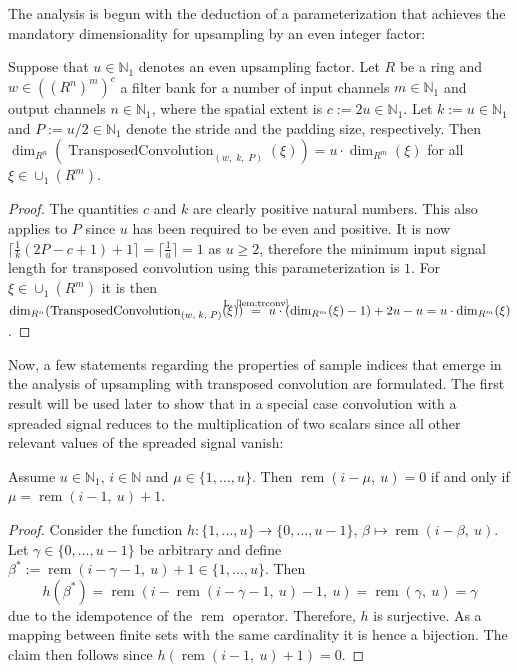 \documentclass[journal]{IEEEtran}
\newcommand{\N}{\mathbb{N}}
\newcommand{\discint}[2]{\{#1,\dotsc,#2\}}
\newcommand{\inint}[2]{\in\discint{#1}{#2}}
\newcommand{\nceil}[1]{\lceil #1 \rceil}
\newcommand{\rem}[2]{\operatorname{rem}(#1,\ #2)}
\newcommand{\equsing}[1]{\overset{\mathclap{\text{#1}}}{=}}
\DeclareMathOperator{\TransposedConvolution}{TransposedConvolution}
\begin{document}
The analysis is begun with the deduction of a parameterization that achieves the mandatory dimensionality for upsampling by an even integer factor:
\begin{remark}
\label{rem:upsmp-trconv}
Suppose that $u\in\N_1$ denotes an even upsampling factor.
Let $R$ be a ring and $w\in((R^n)^m)^c$ a filter bank for a number of input channels $m\in\N_1$ and output channels $n\in\N_1$, where the spatial extent is $c := 2u\in\N_1$.
Let $k := u\in\N_1$ and $P := u/2 \in\N_1$ denote the stride and the padding size, respectively.
Then $\dim_{R^n}(\TransposedConvolution_{(w,\; k,\; P)}(\xi)) = u\cdot\dim_{R^m}(\xi)$ for all $\xi\in\cup_1(R^m)$.
\end{remark}\begin{proof}
The quantities $c$ and $k$ are clearly positive natural numbers.
This also applies to $P$ since $u$ has been required to be even and positive.
It is now $\nceil{\frac{1}{k}(2P - c + 1) + 1} = \nceil{\frac{1}{u}} = 1$ as $u \geq 2$, therefore the minimum input signal length for transposed convolution using this parameterization is $1$.
For $\xi\in\cup_1(R^m)$ it is then $\dim_{R^n}(\TransposedConvolution_{(w,\; k,\; P)}(\xi)) \ \equsing{L.~\ref{lem:trconv}}\ u\cdot(\dim_{R^m}(\xi) - 1) + 2u - u = u\cdot\dim_{R^m}(\xi)$.
\end{proof}

Now, a few statements regarding the properties of sample indices that emerge in the analysis of upsampling with transposed convolution are formulated.
The first result will be used later to show that in a special case convolution with a spreaded signal reduces to the multiplication of two scalars since all other relevant values of the spreaded signal vanish:
\begin{lemma}
\label{lem:upsmp-idx-unique}
Assume $u\in\N_1$, $i\in\N$ and $\mu\inint{1}{u}$.
Then $\rem{i - \mu}{u} = 0$ if and only if $\mu = \rem{i - 1}{u} + 1$.
\end{lemma}\begin{proof}
Consider the function $h\colon\discint{1}{u}\to\discint{0}{u - 1}$, $\beta\mapsto\rem{i - \beta}{u}$.
Let $\gamma\inint{0}{u - 1}$ be arbitrary and define $\beta^* := \rem{i - \gamma - 1}{u} + 1 \inint{1}{u}$.
Then
\begin{displaymath}
  h(\beta^*) = \rem{i - \rem{i - \gamma - 1}{u} - 1}{u} = \rem{\gamma}{u} = \gamma
\end{displaymath}
due to the idempotence of the $\operatorname{rem}$ operator.
Therefore, $h$ is surjective.
As a mapping between finite sets with the same cardinality it is hence a bijection.
The claim then follows since $h( \rem{i - 1}{u} + 1 ) = 0$.
\end{proof}
\end{document}
